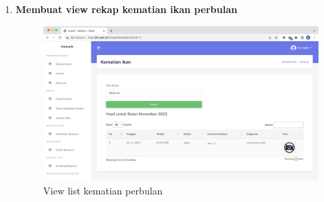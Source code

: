 \begin{enumerate}[1.]
\begin{lstlisting}
[
  {
    "_id": "62a62163e445ffb9c5f746f3",
    "id_int": 4,
    "alias": "charlie",
    "build_at": "2022-06-13 00:24:51.473000",
    "isActive": false
  },
  {
    "_id": "625d7033a9a73e090c65cda2",
    "id_int": 3,
    "alias": "beta",
    "build_at": "2022-04-18 21:05:39.608000",
    "isActive": true,
    "pond_activation": {
      "_id": "62b6b2f1a8a50041ee6350a4",
      "isFinish": false,
      "fish": [
        {
          "lele": 100
        },
        {
          "patin": 200
        }
      ],
      "isWaterPreparation": false,
      "water_level": 100,
      "total_fish_harvested": 0,
      "total_weight_harvested": 0,
      "activated_at": "2022-06-25 14:02:09.881000",
      "fish_death_list": []
    }
  },
  {
    "_id": "625d7026a9a73e090c65cda1",
    "id_int": 2,
    "alias": "alpha",
    "build_at": "2022-04-18 21:05:26.183000",
    "isActive": true,
    "pond_activation": {
      "_id": "62af4c24f6a3ffba25a6be6a",
      "isFinish": false,
      "fish": [
        {
          "lele": 100
        },
        {
          "patin": 200
        }
      ],
      "isWaterPreparation": false,
      "water_level": 1.34,
      "total_fish_harvested": 0,
      "total_weight_harvested": 0,
      "activated_at": "2022-06-19 23:17:40.501000",
      "fish_death_list": [
        {
          "_id": "62b9adfa793e0f39dbaa1739",
          "fish_death_amount": [
            {
              "lele": 10
            },
            {
              "patin": 20
            }
          ],
          "image_name": "Mass-fish-death-Menindee_1656335866.jpeg",
          "diagnosis": "mati karena sakit",
          "image_link": "http://127.0.0.1:5000/api/fishdeath/image/62b9adfa793e0f39dbaa1739"
        }
      ]
    }
  },
  {
    "_id": "62a955888911334402ddb3b3",
    "id_int": 5,
    "alias": "delta",
    "build_at": "2022-06-15 10:44:08.180000",
    "isActive": false
  },
  {
    "_id": "62ada3ff1dc3a711668e7ca3",
    "id_int": 7,
    "alias": "epsilon",
    "isActive": false,
    "build_at": "2022-06-18 17:07:59.396000"
  }
]
\end{lstlisting}

\item \textbf{Membuat view rekap kematian ikan perbulan}
\begin{figure}[H]
	\centering
	\includegraphics[width=1\textwidth]{gambar/Sprint05/view/view_kematian_bulanan}
	\caption{View list kematian perbulan}
	\label{fig:view_list_kematian_bulanan}
\end{figure}




\end{enumerate}